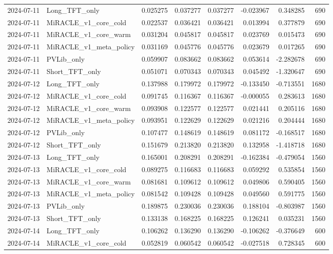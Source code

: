\begin{tabular}{llrrrrrr}
2024-07-11 & Long_TFT_only & 0.025275 & 0.037277 & 0.037277 & -0.023967 & 0.348285 & 690 \\
2024-07-11 & MiRACLE_v1_core_cold & 0.022537 & 0.036421 & 0.036421 & 0.013994 & 0.377879 & 690 \\
2024-07-11 & MiRACLE_v1_core_warm & 0.031204 & 0.045817 & 0.045817 & 0.023769 & 0.015473 & 690 \\
2024-07-11 & MiRACLE_v1_meta_policy & 0.031169 & 0.045776 & 0.045776 & 0.023679 & 0.017265 & 690 \\
2024-07-11 & PVLib_only & 0.059907 & 0.083662 & 0.083662 & 0.053614 & -2.282678 & 690 \\
2024-07-11 & Short_TFT_only & 0.051071 & 0.070343 & 0.070343 & 0.045492 & -1.320647 & 690 \\
2024-07-12 & Long_TFT_only & 0.137988 & 0.179972 & 0.179972 & -0.133450 & -0.713551 & 1680 \\
2024-07-12 & MiRACLE_v1_core_cold & 0.091745 & 0.116367 & 0.116367 & -0.000055 & 0.283613 & 1680 \\
2024-07-12 & MiRACLE_v1_core_warm & 0.093908 & 0.122577 & 0.122577 & 0.021441 & 0.205116 & 1680 \\
2024-07-12 & MiRACLE_v1_meta_policy & 0.093951 & 0.122629 & 0.122629 & 0.021216 & 0.204444 & 1680 \\
2024-07-12 & PVLib_only & 0.107477 & 0.148619 & 0.148619 & 0.081172 & -0.168517 & 1680 \\
2024-07-12 & Short_TFT_only & 0.151679 & 0.213820 & 0.213820 & 0.132958 & -1.418718 & 1680 \\
2024-07-13 & Long_TFT_only & 0.165001 & 0.208291 & 0.208291 & -0.162384 & -0.479054 & 1560 \\
2024-07-13 & MiRACLE_v1_core_cold & 0.089275 & 0.116683 & 0.116683 & 0.059292 & 0.535854 & 1560 \\
2024-07-13 & MiRACLE_v1_core_warm & 0.081681 & 0.109612 & 0.109612 & 0.049806 & 0.590405 & 1560 \\
2024-07-13 & MiRACLE_v1_meta_policy & 0.081542 & 0.109428 & 0.109428 & 0.049560 & 0.591775 & 1560 \\
2024-07-13 & PVLib_only & 0.189875 & 0.230036 & 0.230036 & 0.188104 & -0.803987 & 1560 \\
2024-07-13 & Short_TFT_only & 0.133138 & 0.168225 & 0.168225 & 0.126241 & 0.035231 & 1560 \\
2024-07-14 & Long_TFT_only & 0.106262 & 0.136290 & 0.136290 & -0.106262 & -0.376649 & 600 \\
2024-07-14 & MiRACLE_v1_core_cold & 0.052819 & 0.060542 & 0.060542 & -0.027518 & 0.728345 & 600 \\

\end{tabular}
